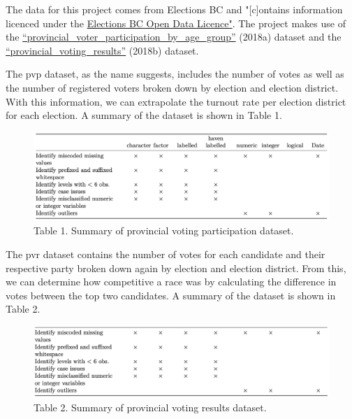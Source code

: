 \documentclass[
]{article}
\begin{document}
The data for this project comes from Elections BC and "{[}c{]}ontains
information licenced under the
\href{https://www.elections.bc.ca/docs/EBC-Open-Data-Licence.pdf}{Elections
BC Open Data Licence"}. The project makes use of the
\href{https://catalogue.data.gov.bc.ca/dataset/6d9db663-8c30-43ec-922b-d541d22e634f/resource/646530d4-078c-4815-8452-c75639962bb4}{``provincial\_voter\_participation\_by\_age\_group''}
(2018a) dataset and the
\href{https://catalogue.data.gov.bc.ca/dataset/44914a35-de9a-4830-ac48-870001ef8935/resource/fb40239e-b718-4a79-b18f-7a62139d9792}{``provincial\_voting\_results''}
(2018b) dataset.

The pvp dataset, as the name suggests, includes the number of votes as
well as the number of registered voters broken down by election and
election district. With this information, we can extrapolate the turnout
rate per election district for each election. A summary of the dataset
is shown in Table 1.

\begin{figure}
\includegraphics[width=1\linewidth]{../eda/bc_election_turnout_files/figure-html/pvp} \caption{Table 1. Summary of provincial voting participation dataset.}\label{fig:tab_1}
\end{figure}

The pvr dataset contains the number of votes for each candidate and
their respective party broken down again by election and election
district. From this, we can determine how competitive a race was by
calculating the difference in votes between the top two candidates. A
summary of the dataset is shown in Table 2.

\begin{figure}
\includegraphics[width=1\linewidth]{../eda/bc_election_turnout_files/figure-html/pvr} \caption{Table 2. Summary of provincial voting results dataset.}\label{fig:unnamed-chunk-1}
\end{figure}
\end{document}
